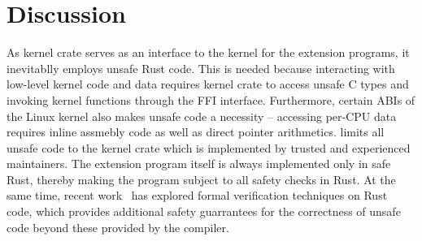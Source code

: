 \section{Discussion}
\label{sec:discussion}

As \projname{} kernel crate serves as an interface to the kernel for the
    extension programs, it inevitablly employs unsafe Rust code.
This is needed because interacting with low-level kernel code and data requires
    kernel crate to access unsafe C types and invoking kernel functions through
    the FFI interface.
Furthermore, certain ABIs of the Linux kernel also makes unsafe code a
    necessity -- accessing per-CPU data requires inline assmebly code as well
    as direct pointer arithmetics.
\projname{} limits all unsafe code to the kernel crate which is implemented by
    trusted and experienced maintainers.
The extension program itself is always implemented only in safe Rust, thereby
    making the program subject to all safety checks in Rust.
At the same time, recent work~\cite{verus} has explored formal verification
    techniques on Rust code, which provides additional safety guarrantees
    for the correctness of unsafe code beyond these provided by the compiler.

